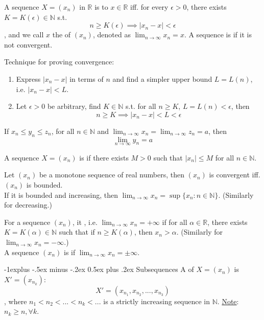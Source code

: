 \documentclass[10pt,landscape,letterpaper]{article}
\makeatletter
\renewcommand{\subsection}{\@startsection{subsection}{2}{0mm}%
                                {-1explus -.5ex minus -.2ex}%
                                {0.5ex plus .2ex}%
                                {\sffamily\normalsize\itshape}}
\makeatother
\begin{document}
\begin{multicols}{3}
\smallbreak


A sequence $X = (x_n)$ in $\mathbb{R}$ is  to $x \in \mathbb{R}$ iff. for every $\epsilon > 0$, there exists $K = K(\epsilon) \in \mathbb{N}$ s.t.
\[
n \ge K(\epsilon) \implies |x_n - x| < \epsilon
\]
, and we call $x$ the  of $(x_n)$, denoted as $\lim_{n \to \infty} x_n = x$. A sequence is  if it is not convergent.


Technique for proving convergence:
\begin{enumerate}
    \item Express $|x_n - x|$ in terms of $n$ and find a simpler upper bound $L = L(n)$, i.e. $|x_n - x| < L$.
    \item Let $\epsilon > 0$ be arbitrary, find $K \in \mathbb{N}$ s.t. for all $n \ge K$, $L = L(n) < \epsilon$, then
    \[
        n \ge K \implies |x_n - x| < L < \epsilon
    \]
\end{enumerate}


\smallbreak


 If $x_n \le y_n \le z_n$, for all $n \in \mathbb{N}$ and $\lim_{n \to \infty} x_n = \lim_{n \to \infty} z_n = a$, then
\[
\lim_{n \to \infty} y_n = a
\]



A sequence $X = (x_n)$ is  if there exists $M > 0$ such that $|x_n| \le M$ for all $n \in \mathbb{N}$.



\smallbreak


 Let $(x_n)$ be a monotone sequence of real numbers, then $(x_n)$ is convergent iff. $(x_n)$ is bounded.
\\
If it is bounded and increasing, then $\lim_{n \to \infty} x_n = \sup \{ x_n: n \in \mathbb{N} \}$. (Similarly for decreasing.)


\smallbreak


For a sequence $(x_n)$, it , i.e. $\lim_{n \to \infty} x_n = + \infty$ if for all $\alpha \in \mathbb{R}$, there exists $K = K(\alpha) \in \mathbb{N}$ such that if $n \ge K(\alpha)$, then $x_n > \alpha$. (Similarly for $\lim_{n \to \infty} x_n = - \infty$.)
\\
A sequence $(x_n)$ is  if $\lim_{n \to \infty} x_n = \pm \infty$.




\subsection{Subsequences}
A  of $X = (x_n)$ is $X' = (x_{n_k})$:
\[
X' = (x_{n_1}, x_{n_2}, ..., x_{n_3})
\]
, where $n_1 < n_2 < ... < n_k < ... $ is a strictly increasing sequence in $\mathbb{N}$. \underline{Note}: $n_k \ge n, \forall k$.



\end{multicols}
\end{document}
